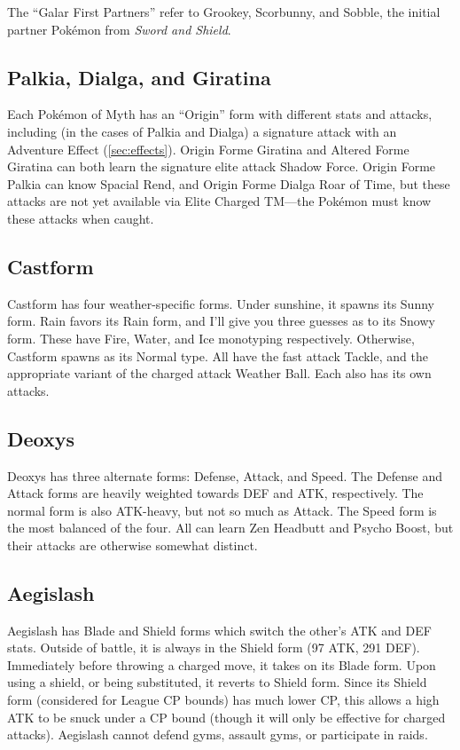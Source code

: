 \begin{tipbox}[title=Galar First Partners]
The ``Galar First Partners'' refer to Grookey, Scorbunny, and Sobble, the
initial partner Pokémon from \textit{Sword and Shield}.
\end{tipbox}

\subsection{Palkia, Dialga, and Giratina}
Each Pokémon of Myth has an ``Origin'' form with different stats and attacks, including
 (in the cases of Palkia and Dialga) a signature attack with an Adventure Effect (\autoref{sec:effects}).
Origin Forme Giratina and Altered Forme Giratina can both learn the signature elite attack Shadow Force.
Origin Forme Palkia can know Spacial Rend, and Origin Forme Dialga Roar of Time, but these
 attacks are not yet available via Elite Charged TM---the Pokémon must know these
 attacks when caught.

\subsection{Castform\label{subsec:castform}}
Castform has four weather-specific forms.
Under sunshine, it spawns its Sunny form.
Rain favors its Rain form, and I'll give you three guesses as to its Snowy form.
These have Fire, Water, and Ice monotyping respectively.
Otherwise, Castform spawns as its Normal type.
All have the fast attack Tackle, and the appropriate variant of the charged attack Weather Ball.
Each also has its own attacks.

\subsection{Deoxys\label{subsec:deoxys}}
Deoxys has three alternate forms: Defense, Attack, and Speed.
The Defense and Attack forms are heavily weighted towards DEF and ATK, respectively.
The normal form is also ATK-heavy, but not so much as Attack.
The Speed form is the most balanced of the four.
All can learn Zen Headbutt and Psycho Boost, but their attacks are otherwise somewhat distinct.

\subsection{Aegislash\label{subsec:aegislash}}
Aegislash has Blade and Shield forms which switch the other's ATK and DEF stats.
Outside of battle, it is always in the Shield form (97 ATK, 291 DEF).
Immediately before throwing a charged move, it takes on its Blade form.
Upon using a shield, or being substituted, it reverts to Shield form.
Since its Shield form (considered for League CP bounds) has much lower CP,
 this allows a high ATK to be snuck under a CP bound (though it will only
 be effective for charged attacks).
Aegislash cannot defend gyms, assault gyms, or participate in raids.

